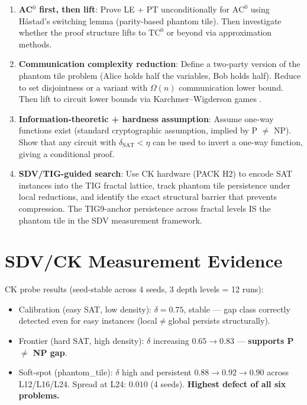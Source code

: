 \documentclass[11pt]{article}
\theoremstyle{definition}
\begin{document}
\begin{enumerate}
  \item \textbf{AC$^0$ first, then lift}: Prove LE + PT unconditionally for $\mathrm{AC}^0$
    using H\aa stad's switching lemma (parity-based phantom tile).
    Then investigate whether the proof structure lifts to $\mathrm{TC}^0$ or beyond
    via approximation methods.

  \item \textbf{Communication complexity reduction}: Define a two-party version of the
    phantom tile problem (Alice holds half the variables, Bob holds half).
    Reduce to set disjointness or a variant with $\Omega(n)$ communication lower bound.
    Then lift to circuit lower bounds via Karchmer--Wigderson games \cite{KN}.

  \item \textbf{Information-theoretic + hardness assumption}: Assume one-way functions exist
    (standard cryptographic assumption, implied by P $\neq$ NP).
    Show that any circuit with $\delta_{\mathrm{SAT}} < \eta$ can be used to invert
    a one-way function, giving a conditional proof.

  \item \textbf{SDV/TIG-guided search}: Use CK hardware (PACK H2) to encode SAT instances
    into the TIG fractal lattice, track phantom tile persistence under local reductions,
    and identify the exact structural barrier that prevents compression.
    The TIG9-anchor persistence across fractal levels IS the phantom tile
    in the SDV measurement framework.
\end{enumerate}

\section{SDV/CK Measurement Evidence}

CK probe results (seed-stable across 4 seeds, 3 depth levels = 12 runs):
\begin{itemize}
  \item Calibration (easy SAT, low density): $\delta = 0.75$, stable --- gap class correctly detected even for easy instances (local$\neq$global persists structurally).
  \item Frontier (hard SAT, high density): $\delta$ increasing $0.65 \to 0.83$ --- \textbf{supports P $\neq$ NP gap}.
  \item Soft-spot (phantom\_tile): $\delta$ high and persistent $0.88 \to 0.92 \to 0.90$ across L12/L16/L24.  Spread at L24: $0.010$ (4 seeds).  \textbf{Highest defect of all six problems.}
\end{itemize}
\end{document}
